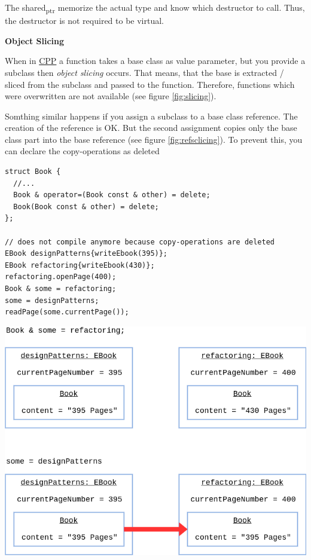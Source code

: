\documentclass[11pt,twoside,landscape]{article}
\begin{document}
\begin{multicols}{3}
The shared\textsubscript{ptr} memorize the actual type and know which destructor to call.
Thus, the destructor is not required to be virtual.

\textbf{Object Slicing}

When in \href{../../../roam/20210920103243-c.org}{CPP} a function takes a base class as value parameter, but you provide a subclass then \emph{object slicing} occurs.
That means, that the base is extracted / sliced from the subclass and passed to the function.
Therefore, functions which were overwritten are not available (see figure \ref{fig:slicing}).

Somthing similar happens if you assign a subclass to a base class reference.
The creation of the reference is OK.
But the second assignment copies only the base class part into the base reference (see figure \ref{fig:refsclicing}).
To prevent this, you can declare the copy-operations as deleted

\lstset{language=c++,label= ,caption= ,captionpos=b,numbers=none}
\begin{lstlisting}
struct Book {
  //...
  Book & operator=(Book const & other) = delete;
  Book(Book const & other) = delete;
};

// does not compile anymore because copy-operations are deleted
EBook designPatterns{writeEbook(395)};
EBook refactoring{writeEbook(430)};
refactoring.openPage(400);
Book & some = refactoring;
some = designPatterns;
readPage(some.currentPage());
\end{lstlisting}


{
\begin{center}
\includegraphics[width=.9\linewidth]{img/object_slicing_in_references.png}
\end{center}
\label{fig:refslicing}
}



\end{multicols}
\end{document}
